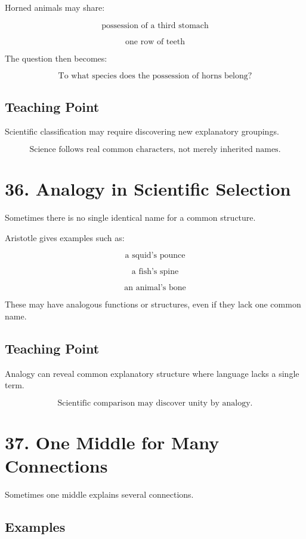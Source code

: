 \documentclass[12pt]{article}
\begin{document}
Horned animals may share:

\[
\text{possession of a third stomach}
\]

\[
\text{one row of teeth}
\]

The question then becomes:

\[
\text{To what species does the possession of horns belong?}
\]

\subsection*{Teaching Point}

Scientific classification may require discovering new explanatory groupings.

\[
\boxed{
\text{Science follows real common characters, not merely inherited names.}
}
\]

\section*{36. Analogy in Scientific Selection}

Sometimes there is no single identical name for a common structure.

Aristotle gives examples such as:

\[
\text{a squid's pounce}
\]

\[
\text{a fish's spine}
\]

\[
\text{an animal's bone}
\]

These may have analogous functions or structures, even if they lack one common
name.

\subsection*{Teaching Point}

Analogy can reveal common explanatory structure where language lacks a single
term.

\[
\boxed{
\text{Scientific comparison may discover unity by analogy.}
}
\]

\section*{37. One Middle for Many Connections}

Sometimes one middle explains several connections.

\subsection*{Examples}
\end{document}
